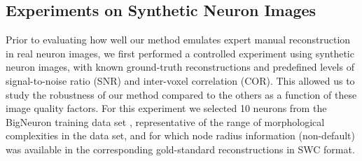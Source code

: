 \subsection{Experiments on Synthetic Neuron Images}
\label{subsec:eval-sim}
Prior to evaluating how well our method emulates expert manual reconstruction in real neuron images, we first performed a controlled experiment using synthetic neuron images, with known ground-truth reconstructions and predefined levels of signal-to-noise ratio (SNR) and inter-voxel correlation (COR). This allowed us to study the robustness of our method compared to the others as a function of these image quality factors. For this experiment we selected 10 neurons from the BigNeuron training data set \cite{peng2015bigneuron}, representative of the range of morphological complexities in the data set, and for which node radius information (non-default) was available in the corresponding gold-standard reconstructions in SWC format.
